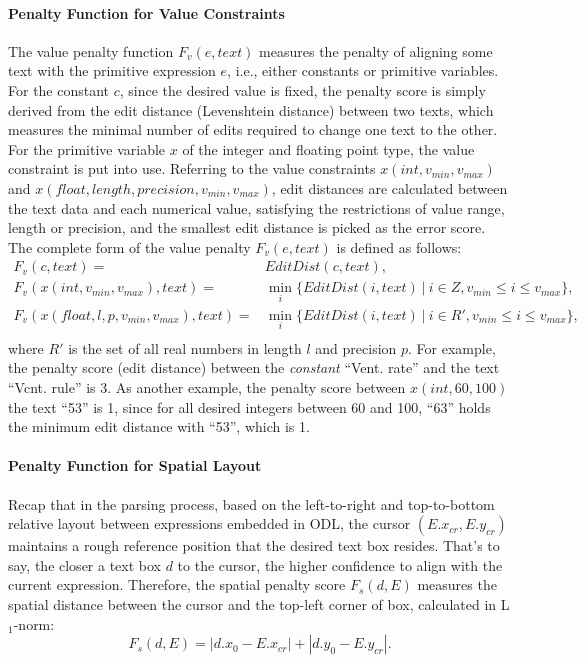 \paragraph{Penalty Function for Value Constraints}
The value penalty function $F_v(e, text)$ measures the penalty of
aligning some text with the primitive expression $e$,
i.e., either constants or primitive variables.
For the constant $c$, since the desired value is fixed, the penalty score
is simply derived from the edit distance (Levenshtein distance)
between two texts,
which measures the minimal number of edits required to change one text to
the other.
For the primitive variable $x$ of the integer and floating point type,
the value constraint is put into use.
Referring to the value constraints $x(int, v_{min}, v_{max})$ and
$x(float, length, precision, v_{min}, v_{max})$,
edit distances are calculated between the text data and each numerical value,
satisfying the restrictions of value range, length or precision,
and the smallest edit distance is picked as the error score.
The complete form of the value penalty $F_v(e, text)$ is defined as follows:
\begin{equation}
  \begin{aligned}
    F_v(c,text)= & EditDist(c, text), \\
    F_v(x(int,v_{min},v_{max}),text)= &
    \min_i\{EditDist(i,text)\ |\ i \in Z, v_{min} \leq i \leq v_{max}\}, \\
    F_v(x(float,l,p,v_{min},v_{max}),text)= &
    \min_i\{EditDist(i,text)\ |\ i \in R', v_{min} \leq i \leq v_{max}\}, \\
  \end{aligned}
\end{equation}
\noindent
where $R'$ is the set of all real numbers in length $l$ and precision $p$.
For example, the penalty score (edit distance)
between the \textit{constant} ``Vent. rate'' and the text ``Vcnt. rule'' is 3.
As another example, the penalty score between $x(int, 60, 100)$ the text ``53''
is 1, since for all desired integers between 60 and 100,
``63'' holds the minimum edit distance with ``53'', which is 1.

\paragraph{Penalty Function for Spatial Layout}
Recap that in the parsing process, based on the left-to-right and top-to-bottom
relative layout between expressions embedded in ODL,
the cursor $(E.x_{cr}, E.y_{cr})$ maintains a rough reference position
that the desired text box resides.
That's to say, the closer a text box $d$ to the cursor,
the higher confidence to align with the current expression.
Therefore, the spatial penalty score $F_s(d, E)$ measures the spatial distance
between the cursor and the top-left corner of box, calculated in L$_1$-norm:
\begin{equation}
	F_s(d, E) = |d.x_0 - E.x_{cr}| + |d.y_0 - E.y_{cr}|.
\end{equation}

